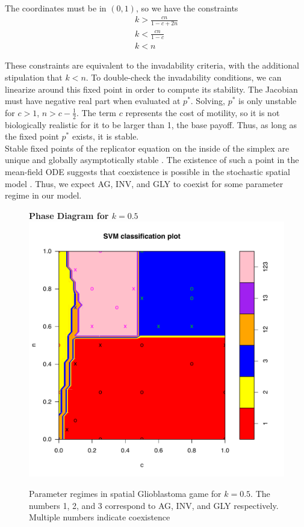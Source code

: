 \documentclass[12pt]{report}
\begin{document}
		
The coordinates must be in $(0,1)$, so we have the constraints
\begin{gather}
k > \frac{cn}{1 - c + 2n}\\
k < \frac{cn}{1-c} \\
k < n
\end{gather}

These constraints are equivalent to the invadability criteria, with the additional stipulation that $k < n$. 
To double-check the invadability conditions, we can linearize around this fixed point in order to compute its stability. The Jacobian must have negative real part when evaluated at $p^*$. Solving, $p^*$ is only unstable for $c > 1$, $n > c - \frac{1}{2}$. The term $c$ represents the cost of motility, so it is not biologically realistic for it to be larger than 1, the base payoff. Thus, as long as the fixed point $p^*$ exists, it is stable. \\

Stable fixed points of the replicator equation on the inside of the simplex are unique and globally asymptotically stable \cite{Hofbauer1998}. The existence of such a point in the mean-field ODE suggests that coexistence is possible in the stochastic spatial model \cite{Durrett1994}. Thus, we expect AG, INV, and GLY to coexist for some parameter regime in our model. 


\begin{figure}[H]
\centering
\textbf{Phase Diagram for $k = 0.5$}
\includegraphics[width = 0.9 \linewidth]{Diagrams/basanta_phase-cropped}
\caption{Parameter regimes in spatial Glioblastoma game for $k = 0.5$. The numbers 1, 2, and 3 correspond to AG, INV, and GLY respectively. Multiple numbers indicate coexistence}
\end{figure}
\end{document}

